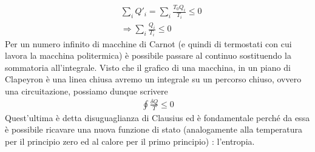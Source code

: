 \documentclass[10pt,a4paper]{article}
\begin{document}
\begin{align*}
	&\sum_i Q'_i = \sum_i\frac{T_0 Q_i}{T_i}\leq 0\\
	&\Rightarrow \sum_i \frac{Q_i}{T_i}\leq 0
\end{align*}
Per un numero infinito di macchine di Carnot (e quindi di termostati con cui lavora la macchina politermica) è possibile passare al continuo sostituendo la sommatoria all'integrale. Visto che il grafico di una macchina, in un piano di Clapeyron è una linea chiusa avremo un integrale su un percorso chiuso, ovvero una circuitazione, possiamo dunque scrivere
\begin{align*}
	\oint \frac{\delta Q}{T}\leq 0
\end{align*}
Quest'ultima è detta disuguaglianza di Clausius ed è fondamentale perché da essa è possibile ricavare una nuova funzione di stato (analogamente alla temperatura per il principio zero ed al calore per il primo principio) : l'entropia.
\appendix
\end{document}
